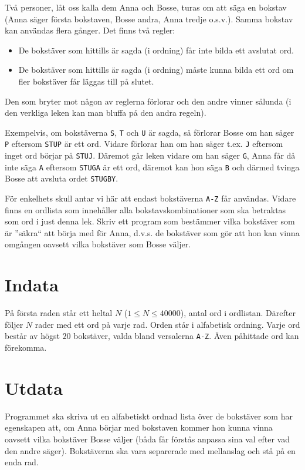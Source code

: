 Två personer, låt oss kalla dem Anna och Bosse, turas om att säga en bokstav (Anna säger första bokstaven, Bosse andra, Anna tredje o.s.v.). Samma bokstav kan användas flera gånger. Det finns två regler:

\begin{itemize}
	\item De bokstäver som hittills är sagda (i ordning) får inte bilda ett avslutat ord.
	\item De bokstäver som hittills är sagda (i ordning) måste kunna bilda ett ord om fler bokstäver får läggas till på slutet.
\end{itemize}

Den som bryter mot någon av reglerna förlorar och den andre vinner sålunda (i den verkliga leken kan man bluffa på den andra regeln).

Exempelvis, om bokstäverna \texttt{S}, \texttt{T} och \texttt{U} är sagda, så förlorar Bosse om han säger \texttt{P} eftersom \texttt{STUP} är ett ord. Vidare förlorar han om han säger t.ex. \texttt{J} eftersom inget ord börjar på \texttt{STUJ}. Däremot går leken vidare om han säger \texttt{G}, Anna får då inte säga \texttt{A} eftersom \texttt{STUGA} är ett ord, däremot kan hon säga \texttt{B} och därmed tvinga Bosse att avsluta ordet \texttt{STUGBY}.

För enkelhets skull antar vi här att endast bokstäverna \texttt{A-Z} får användas. Vidare finns en ordlista som innehåller alla bokstavskombinationer som ska betraktas som ord i just denna lek. Skriv ett program som bestämmer vilka bokstäver som är ''säkra`` att börja med för Anna, d.v.s. de bokstäver som gör att hon kan vinna omgången oavsett vilka bokstäver som Bosse väljer.

\section*{Indata}
På första raden står ett heltal $N$ ($1 \leq N \leq 40000$), antal ord i ordlistan. Därefter följer $N$ rader med ett ord på varje rad. Orden står i alfabetisk ordning. Varje ord består av högst $20$ bokstäver, valda bland versalerna \texttt{A-Z}. Även påhittade ord kan förekomma.

\section*{Utdata}
Programmet ska skriva ut en alfabetiskt ordnad lista över de bokstäver som har egenskapen att, om Anna börjar med bokstaven kommer hon kunna vinna oavsett vilka bokstäver Bosse väljer (båda får förstås anpassa sina val efter vad den andre säger). Bokstäverna ska vara separerade med mellanslag och stå på en enda rad.

